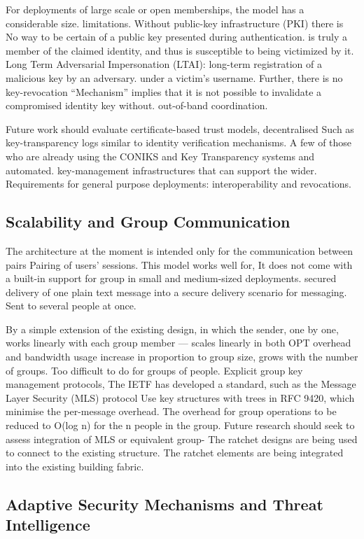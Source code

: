 \documentclass[conference]{IEEEtran}
\begin{document}
For deployments of large scale or open memberships, the model has a considerable size.
limitations.  Without public-key infrastructure (PKI) there is
No way to be certain of a public key presented during authentication.
is truly a member of the claimed identity, and thus is susceptible to being victimized by it.
Long Term Adversarial Impersonation (LTAI): long-term registration of a malicious key by an adversary.
under a victim's username.  Further, there is no key-revocation
“Mechanism” implies that it is not possible to invalidate a compromised identity key without.
out-of-band coordination.

Future work should evaluate certificate-based trust models, decentralised
Such as key-transparency logs similar to identity verification mechanisms.
A few of those who are already using the CONIKS and Key Transparency systems and automated.
key-management infrastructures that can support the wider.
Requirements for general purpose deployments: interoperability and revocations.


\subsection{Scalability and Group Communication}

The architecture at the moment is intended only for the communication between pairs
Pairing of users' sessions.  This model works well for,
It does not come with a built-in support for group in small and medium-sized deployments.
secured delivery of one plain text message into a secure delivery scenario for messaging.
Sent to several people at once.

By a simple extension of the existing design, in which the sender, one by one,
works linearly with each group member — scales linearly in both
OPT overhead and bandwidth usage increase in proportion to group size, grows with the number of groups.
Too difficult to do for groups of people.  Explicit group key management protocols,
The IETF has developed a standard, such as the Message Layer Security (MLS) protocol
Use key structures with trees in RFC 9420, which minimise the per-message overhead.
The overhead for group operations to be reduced to O(log n) for the n people in the group.
Future research should seek to assess integration of MLS or equivalent group-
The ratchet designs are being used to connect to the existing structure. The ratchet elements are being integrated into the existing building fabric.

\subsection{Adaptive Security Mechanisms and Threat Intelligence}
\end{document}
